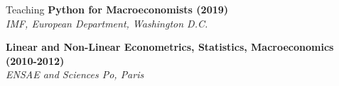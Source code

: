 \documentclass[usegeometry, 10pt, a4paper]{cv} %
\newcommand{\activite}[1]{\textbf{#1}\ }
\begin{document}
\begin{rubriquetableau}[0.95\textwidth]{Teaching}
\small
\activite{Python for Macroeconomists (2019)} \\
\hspace{0.6cm} \small{\emph{IMF, European Department, Washington D.C.}}
\vspace{0.3cm} 

\small
\activite{Linear and Non-Linear Econometrics, Statistics, Macroeconomics (2010-2012)} \\
\hspace{0.6cm} \small{\emph{ENSAE and Sciences Po, Paris}}
\vspace{0.3cm} 
\end{rubriquetableau}
\end{document}
